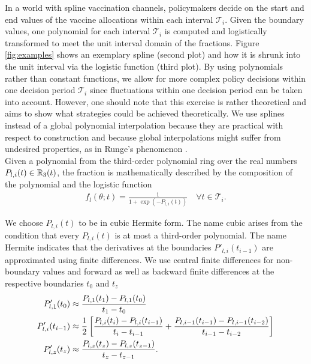 In a world with spline vaccination channels, policymakers decide on the start and end values of the vaccine allocations within each interval $\mathcal{T}_i$. Given the boundary values, one polynomial for each interval $\mathcal{T}_i$ is computed and logistically transformed to meet the unit interval domain of the fractions. Figure \ref{fig:examples} shows an exemplary spline (second plot) and how it is shrunk into the unit interval via the logistic function (third plot). By using polynomials rather than constant functions, we allow for more complex policy decisions within one decision period $\mathcal{T}_i$ since fluctuations within one decision period can be taken into account. However, one should note that this exercise is rather theoretical and aims to show what strategies could be achieved theoretically.
We use splines instead of a global polynomial interpolation because they are practical with respect to construction and because global interpolations might suffer from undesired properties, as in Runge's phenomenon \citep{Runge.1901}.\\
 
%
Given a polynomial from the third-order polynomial ring over the real numbers $P_{l,i}(t) \in \mathbb{R}_3(t)$, the fraction is mathematically described by the composition of the polynomial and the logistic function
\begin{align}
f_{l}(\theta; t) =  \frac{1}{1 + \exp{(-P_{l,i}(t))}} \quad \forall t \in \mathcal{T}_i. 
\end{align}

We choose $P_{l,i}(t)$ to be in cubic Hermite form. The name cubic arises from the condition that every $P_{l,i}(t)$ is at most a third-order polynomial. The name Hermite indicates that the derivatives at the boundaries $P'_{l,i}(t_{i-1})$ are approximated using finite differences. We use central finite differences for non-boundary values and forward as well as backward finite differences at the respective boundaries $t_0$ and $t_{z}$
\begin{align}
\label{eq:finite_differences}
P'_{l,1}(t_0) &\approx \frac{P_{l,1}(t_1) - P_{l,1}(t_0)}{t_1 - t_0} \\
P'_{l,i}(t_{i-1}) &\approx \frac{1}{2}\left[\frac{P_{l,i}(t_{i}) - P_{l,i}(t_{i-1})}{t_{i} - t_{i-1}} + \frac{P_{l,i-1}(t_{i-1}) - P_{l,i-1}( t_{i-2})}{t_{i-1} - t_{i-2}} \right] \notag \\
P'_{l,z}(t_{z}) &\approx \frac{P_{l,z}(t_{z}) - P_{l,z}(t_{z-1})}{t_{z} - t_{z-1}} \notag .
\end{align}

